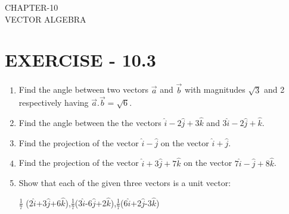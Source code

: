 \documentclass[12pt]{article}
\begin{document}
\begin{center}
\textbf\large{CHAPTER-10 \\ VECTOR ALGEBRA}
\end{center}

\section{EXERCISE - 10.3}
\begin{enumerate}
\item Find the angle between two vectors $\overrightarrow{a}$ and $\overrightarrow {b} $ with magnitudes $\sqrt{3}$ and 2 respectively having $\overrightarrow {a}.\overrightarrow {b}=\sqrt{6}$.
\item Find the angle between the the vectors $\hat{i}-2\hat{j}+3\hat{k}$ and $3\hat{i}-2\hat{j}+\hat{k}$.
\item Find the projection of the vector $\hat{i}-\hat{j}$ on the vector $\hat{i}+\hat{j}$.
\item Find the projection of the vector $\hat{i}+3\hat{j}+7\hat{k}$ on the vector $7\hat{i}-\hat{j}+8\hat{k}$.
\item Show that each of the given three vectors is a unit vector: 

 $\frac{1}{7}$ (2$\hat{i}$+3$\hat{j}$+6$\hat{k}$),$\frac{1}{7}$(3$\hat{i}$-6$\hat{j}$+2$\hat{k}$),$\frac{1}{7}$(6$\hat{i}$+2$\hat{j}$-3$\hat{k}$)
 

\end{enumerate}
\end{document}

